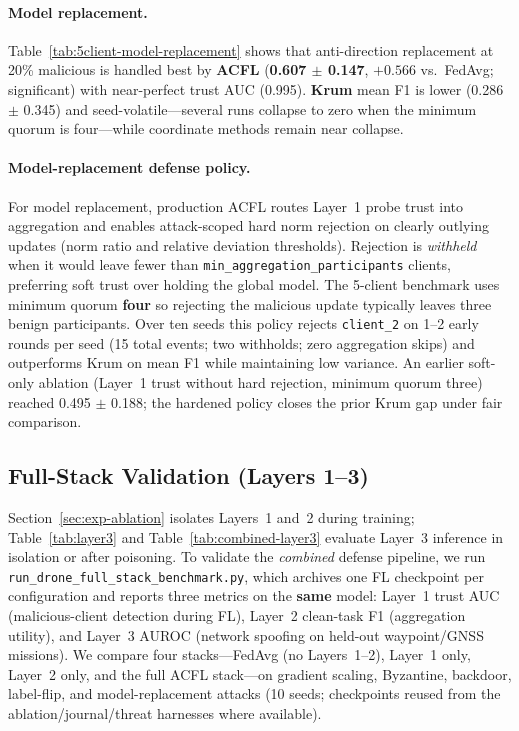 \paragraph{Model replacement.}
Table~\ref{tab:5client-model-replacement} shows that anti-direction replacement at 20\% malicious is handled best by \textbf{ACFL} (\textbf{0.607 $\pm$ 0.147}, $+0.566$ vs.\ FedAvg; significant) with near-perfect trust AUC (0.995).
\textbf{Krum} mean F1 is lower (0.286 $\pm$ 0.345) and seed-volatile---several runs collapse to zero when the minimum quorum is four---while coordinate methods remain near collapse.

\paragraph{Model-replacement defense policy.}
For model replacement, production ACFL routes Layer~1 probe trust into aggregation and enables attack-scoped hard norm rejection on clearly outlying updates (norm ratio and relative deviation thresholds).
Rejection is \emph{withheld} when it would leave fewer than \texttt{min\_aggregation\_participants} clients, preferring soft trust over holding the global model.
The 5-client benchmark uses minimum quorum \textbf{four} so rejecting the malicious update typically leaves three benign participants.
Over ten seeds this policy rejects \texttt{client\_2} on 1--2 early rounds per seed (15 total events; two withholds; zero aggregation skips) and outperforms Krum on mean F1 while maintaining low variance.
An earlier soft-only ablation (Layer~1 trust without hard rejection, minimum quorum three) reached 0.495 $\pm$ 0.188; the hardened policy closes the prior Krum gap under fair comparison.

\subsection{Full-Stack Validation (Layers 1--3)}
\label{sec:exp-full-stack}

Section~\ref{sec:exp-ablation} isolates Layers~1 and~2 during training; Table~\ref{tab:layer3} and Table~\ref{tab:combined-layer3} evaluate Layer~3 inference in isolation or after poisoning.
To validate the \emph{combined} defense pipeline, we run \texttt{run\_drone\_full\_stack\_benchmark.py}, which archives one FL checkpoint per configuration and reports three metrics on the \textbf{same} model: Layer~1 trust AUC (malicious-client detection during FL), Layer~2 clean-task F1 (aggregation utility), and Layer~3 AUROC (network spoofing on held-out waypoint/GNSS missions).
We compare four stacks---FedAvg (no Layers~1--2), Layer~1 only, Layer~2 only, and the full ACFL stack---on gradient scaling, Byzantine, backdoor, label-flip, and model-replacement attacks (10 seeds; checkpoints reused from the ablation/journal/threat harnesses where available).

